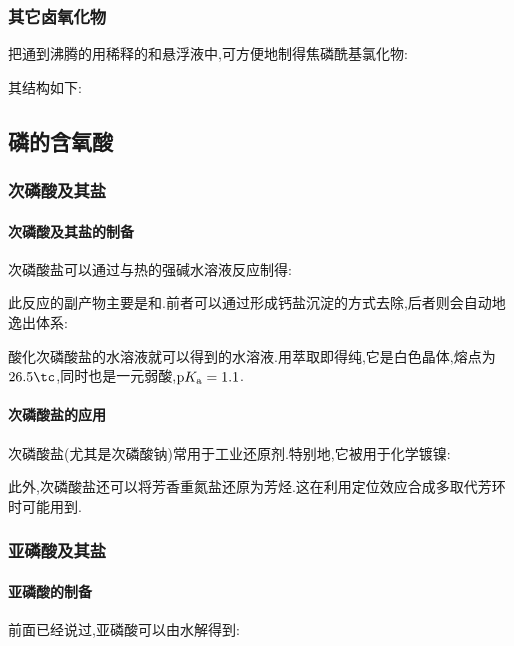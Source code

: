 \documentclass{ctexart}
\begin{document}
\subsubsection{其它卤氧化物}
把通到沸腾的用稀释的和悬浮液中,可方便地制得焦磷酰基氯化物:
\begin{center}
\end{center}
其结构如下:
\subsection{磷的含氧酸}
\subsubsection{次磷酸及其盐}
\paragraph{次磷酸及其盐的制备}
次磷酸盐可以通过与热的强碱水溶液反应制得:
\begin{center}
\end{center}
此反应的副产物主要是和.前者可以通过形成钙盐沉淀的方式去除,后者则会自动地逸出体系:
\begin{center}
\end{center}
酸化次磷酸盐的水溶液就可以得到的水溶液.用萃取即得纯,它是白色晶体,熔点为$26.5\tc$,同时也是一元弱酸,$\text pK_\text a=1.1$.
\paragraph{次磷酸盐的应用}
次磷酸盐(尤其是次磷酸钠)常用于工业还原剂.特别地,它被用于化学镀镍:
\begin{center}
\end{center}
此外,次磷酸盐还可以将芳香重氮盐还原为芳烃.这在利用定位效应合成多取代芳环时可能用到.
\subsubsection{亚磷酸及其盐}
\paragraph{亚磷酸的制备}
前面已经说过,亚磷酸可以由水解得到:
\begin{center}
\end{center}
\end{document}
